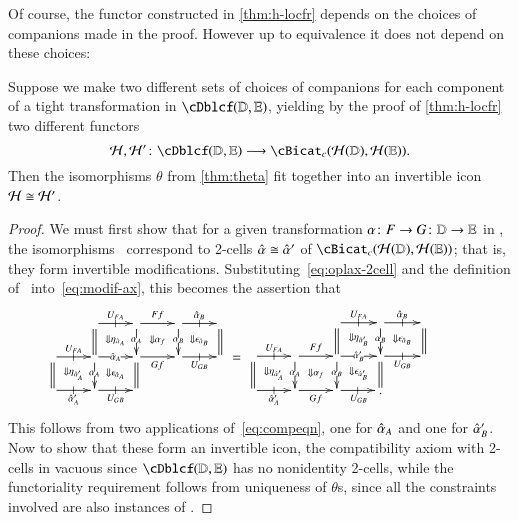 Of course, the functor constructed in \cref{thm:h-locfr} depends on the choices of companions made in the proof.
However up to equivalence it does not depend on these choices:

\begin{lem}\label{thm:h-locfr-uniq}
  Suppose we make two different sets of choices of companions for each component of a tight transformation in $\cDblcf(\lD,\lE)$, yielding by the proof of \cref{thm:h-locfr} two different functors
  \[\cH,\cH'\maps \cDblcf(\lD,\lE)\too \cBicat_c(\cH(\lD),\cH(\lE)).\]
  Then the isomorphisms $\theta$ from \autoref{thm:theta} fit together
  into an invertible icon $\mathcal{H}\cong \mathcal{H}'$.
\end{lem}
\begin{proof}
  We must first show that for a given transformation $\alpha\colon F\to
  G\colon \mathbb{D}\to\mathbb{E}$ in \cDbl, the isomorphisms \th\ correspond to 2-cells $\hat{\alpha} \cong \hat{\alpha}'$ of $\cBicat_c(\cH(\lD),\cH(\lE))$; that is, they form invertible
  modifications.
  Substituting~\eqref{eq:oplax-2cell} and the definition of \th\
  into~\eqref{eq:modif-ax}, this becomes the assertion that
  \begin{equation}
    \vcenter{\xymatrix@R=1.5pc@C=2pc{
        &
        \ar[r]|-@{|}^{U_{FA}}\ar@{=}[d] \ar@{}[dr]|{\Downarrow \eta_{\hat{\alpha}_A}} &
        \ar[r]^{Ff}\ar[d]|{\al_A} \ar@{}[dr]|{\Downarrow \al_f} &
        \ar[r]|-@{|}^{\alhat_B}\ar[d]|{\al_B} \ar@{}[dr]|{\Downarrow \epsilon_{\hat{\alpha}_B}} &
        \ar@{=}[d]\\
        \ar[r]|-@{|}^{U_{FA}} \ar@{=}[d] \ar@{}[dr]|{\Downarrow \eta_{\hat{\alpha}_A'}} &
        \ar[r]|{\alhat_A} \ar[d]|{\al_A} \ar@{}[dr]|{\Downarrow \epsilon_{\hat{\alpha}_A}}&
        \ar[r]_{Gf}  \ar@{=}[d] &
        \ar[r]|-@{|}_{U_{GB}} & \\
        \ar[r]|-@{|}_{\alhat_A'} & \ar[r]|-@{|}_{U_{GB}}&&
      }} \;=\;
    \vcenter{\xymatrix@R=1.5pc@C=2pc{
        && \ar@{=}[d] \ar[r]|-@{|}^{U_{FA}} \ar@{}[dr]|{\Downarrow \eta_{\hat{\alpha}_B'}} &
        \ar[d]|{\al_B} \ar[r]|-@{|}^{\alhat_B} \ar@{}[dr]|{\Downarrow \epsilon_{\hat{\alpha}_B}}
        &
        \ar@{=}[d] &\\
        \ar[r]|-@{|}^{U_{FA}}\ar@{=}[d] \ar@{}[dr]|{\Downarrow \eta_{\hat{\alpha}_A'}} &
        \ar[r]^{Ff}\ar[d]|{\al_A} \ar@{}[dr]|{\Downarrow \al_f} &
        \ar[r]|{\alhat_B'}\ar[d]|{\al_B} \ar@{}[dr]|{\Downarrow \epsilon_{\hat{\alpha}_B'}} &
        \ar@{=}[d] \ar[r]|-@{|}_{U_{GB}}&\\
        \ar[r]|-@{|}_{\alhat_A'} &
        \ar[r]_{Gf} &
        \ar[r]|-@{|}_{U_{GB}} & .
      }}
  \end{equation}
  This follows from two applications of~\eqref{eq:compeqn}, one for
  $\hat{\alpha}_A$ and one for $\hat{\alpha}_B'$.
  Now to show that these form an invertible icon, the compatibility axiom with 2-cells in vacuous since $\cDblcf(\lD,\lE)$ has
  no nonidentity 2-cells, while the functoriality requirement follows from uniqueness of $\theta$s,
  since all the constraints involved are also instances of \th.
\end{proof}


